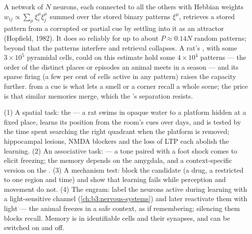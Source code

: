 \begin{proposition}\label{prop:b3:learning-memory:capacity}
A network of $N$ neurons, each connected to all the others with
Hebbian weights $w_{ij} \propto \sum_{\mu}\xi_{i}^{\mu}\xi_{j}^{\mu}$
summed over the stored binary patterns $\xi^{\mu}$, retrieves a stored
pattern from a corrupted or partial cue by settling into it as an
attractor (Hopfield, 1982). It does so reliably for up to about $P
\approx 0.14N$ random patterns; beyond that the patterns interfere and
retrieval collapses. A rat's , with some $3\times 10^{5}$ pyramidal
cells, could on this estimate hold some $4\times 10^{4}$ patterns ---
the order of the distinct places or episodes an animal meets in a
season --- and its sparse firing (a few per cent of cells active in any
pattern) raises the capacity further.  from a cue is
what lets a smell or a corner recall a whole scene; the price is that
similar memories merge, which the 's separation resists.
\end{proposition}
\admitted

\begin{method}\label{met:b3:learning-memory:tests}
(1) A spatial task: the  --- a rat swims in opaque
water to a platform hidden at a fixed place, learns its position from
the room's cues over days, and is tested by the time spent searching
the right quadrant when the platform is removed; hippocampal lesions,
NMDA blockers and the loss of LTP each abolish the learning. (2) An
associative task:  --- a tone paired with a foot shock
comes to elicit freezing; the memory depends on the amygdala, and a
context-specific version on the . (3) A mechanism test:
block the candidate (a drug, a  restricted to one region and
time) and show that learning fails while perception and movement do
not. (4) The engram: label the neurons active during learning with a
light-sensitive channel (\cref{ch:b3:nervous-systems}) and later
reactivate them with light --- the animal freezes in a safe context, as
if remembering; silencing them blocks recall. Memory is in identifiable
cells and their synapses, and can be switched on and off.
\end{method}

